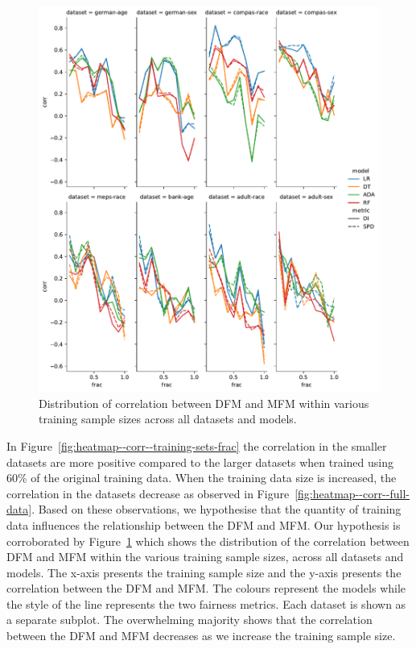 \documentclass{article}
\begin{document}
\begin{figure}
  \centering
  \includegraphics[width=0.95\linewidth]{lineplot--frac--corr.pdf}
  \caption{Distribution of correlation between DFM and MFM within
  various training sample sizes across all datasets and models.}
  \label{fig:lineplot--frac--corr}
\end{figure}

In Figure \ref{fig:heatmap--corr--training-sets-frac} the correlation
in the smaller datasets are more positive compared to the larger
datasets when trained using 60\% of the original training data. When
the training data size is increased, the correlation in the datasets
decrease as observed in
Figure \ref{fig:heatmap--corr--full-data}. Based on these
observations, we hypothesise that the quantity of training data
influences the relationship between the DFM and MFM. Our hypothesis is
corroborated by Figure \ref{fig:lineplot--frac--corr} which shows the
distribution of the correlation between DFM and MFM within the various
training sample sizes, across all datasets and models. The x-axis
presents the training sample size and the y-axis presents the
correlation between the DFM and MFM. The colours represent the models
while the style of the line represents the two fairness metrics. Each
dataset is shown as a separate subplot. The overwhelming majority
shows that the correlation between the DFM and MFM decreases as we
increase the training sample size.
\end{document}
